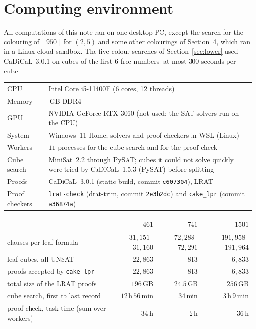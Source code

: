 \documentclass[11pt,a4paper]{article}
\theoremstyle{definition}
\theoremstyle{remark}
\begin{document}
\clearpage
\section{Computing environment}\label{sec:env}
All computations of this note ran on one desktop PC, except the search for the colouring of $[950]$ for $(2,5)$ and some other colourings of Section~4, which ran in a Linux cloud sandbox. The five-colour searches of Section~\ref{sec:lower} used CaDiCaL~3.0.1 on cubes of the first $6$ free numbers, at most $300$ seconds per cube.
\begin{center}
\footnotesize
\renewcommand{\arraystretch}{1.0}
\begin{tabular}{>{\raggedright}p{3.2cm}>{\raggedright\arraybackslash}p{10.4cm}}
\toprule
CPU & Intel Core i5-11400F (6 cores, 12 threads)\\
Memory & 32\,GB DDR4\\
GPU & NVIDIA GeForce RTX 3060 (not used; the SAT solvers run on the CPU)\\
System & Windows~11 Home; solvers and proof checkers in WSL (Linux)\\
Workers & $11$ processes for the cube search and for the proof check\\
Cube search & MiniSat~2.2 through PySAT; cubes it could not solve quickly were tried by CaDiCaL~1.5.3 (PySAT) before splitting\\
Proofs & CaDiCaL~3.0.1 (static build, commit \texttt{c607304}), LRAT\\
Proof checkers & \texttt{lrat-check} (drat-trim, commit \texttt{2e3b2dc}) and \texttt{cake\_lpr} (commit \texttt{a36874a})\\
\bottomrule
\end{tabular}
\end{center}
\begin{center}
\footnotesize
\renewcommand{\arraystretch}{1.0}
\begin{tabular}{lrrr}
\toprule
 & $461$ & $741$ & $1501$\\
\midrule
clauses per leaf formula & $31{,}151$--$31{,}160$ & $72{,}288$--$72{,}291$ & $191{,}958$--$191{,}964$\\
leaf cubes, all UNSAT & $22{,}863$ & $813$ & $6{,}833$\\
proofs accepted by \texttt{cake\_lpr} & $22{,}863$ & $813$ & $6{,}833$\\
total size of the LRAT proofs & $196$\,GB & $24.5$\,GB & $256$\,GB\\
cube search, first to last record & $12$\,h\,$56$\,min & $34$\,min & $3$\,h\,$9$\,min\\
proof check, task time (sum over workers) & $34$\,h & $2$\,h & $36$\,h\\
\bottomrule
\end{tabular}
\end{center}
\end{document}
